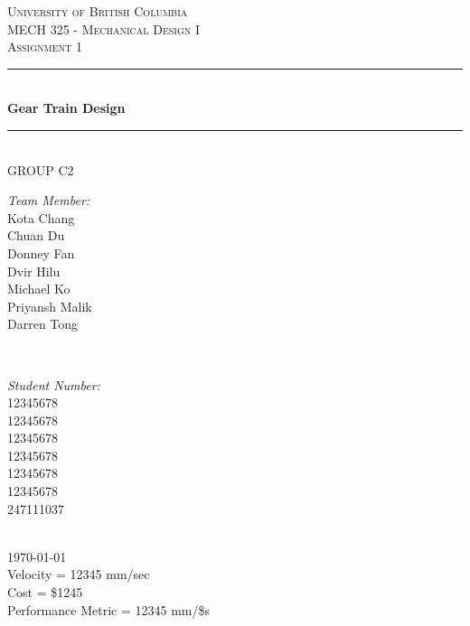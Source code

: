 \documentclass[letterpaper,12pt]{article}
\begin{document}
	
	\begin{titlepage}
		
		\newcommand{\HRule}{\rule{\linewidth}{0.5mm}}
		
		\center
		
		\textsc{\LARGE University of British Columbia}\\[1.5cm]
		\textsc{\Large MECH 325 - Mechanical Design I}\\[0.5cm]
		\textsc{\Large Assignment 1}\\[0.5cm]
		
		\HRule \\[0.8cm]
		{ \huge \bfseries Gear Train Design}\\[0.4cm]
		\HRule \\[1cm]
		
		{\Large GROUP C2}\\
		\vspace{0.5cm}
		
		\begin{minipage}{0.4\textwidth}
			\begin{flushleft} \large
				\emph{Team Member:}\\
				Kota Chang\\
				Chuan Du\\
				Donney Fan\\
				Dvir Hilu\\
				Michael Ko\\
				Priyansh Malik\\
				Darren Tong\\
			\end{flushleft}
		\end{minipage}
		~
		\begin{minipage}{0.4\textwidth}
			\begin{flushright} \large
				\emph{Student Number:} \\
				12345678\\
				12345678\\
				12345678\\
				12345678\\
				12345678\\
				12345678\\
				247111037
			\end{flushright}
		\end{minipage}\\[2cm]
		
		{\large \today}\\[2cm]
		
		{\large
			Velocity = 12345 mm/sec\\
			Cost = \$1245\\
			Performance Metric = 12345 mm/\$s
		}
		
		
		\vfill %
		
	\end{titlepage}
	
\end{document}
